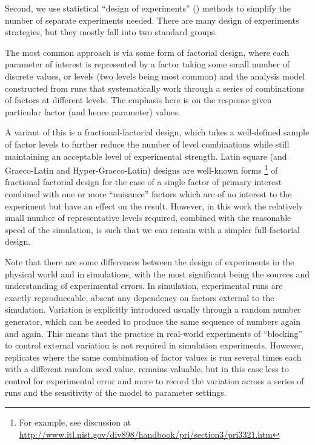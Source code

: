 Second, we use statistical ``design of experiments'' (\eg \cite{Montgomery2009}) methods to simplify the number of separate experiments needed. There are many design of experiments strategies, but they mostly fall into two standard groups. 

The most common approach is via some form of factorial design, where each parameter of interest is represented by a factor taking some small number of discrete values, or levels (two levels being most common) and the analysis model constructed from runs that systematically work through a series of combinations of factors at different levels. The emphasis here is on the response given particular factor (and hence parameter) values. 

A variant of this is a fractional-factorial design, which takes a well-defined sample of factor levels to further reduce the number of level combinations while still maintaining an acceptable level of experimental strength. Latin square (and Graeco-Latin and Hyper-Graeco-Latin) designs are well-known forms \footnote{For example, see discussion at \url{http://www.itl.nist.gov/div898/handbook/pri/section3/pri3321.htm}} of fractional factorial design for the case of a single factor of primary interest combined with one or more ``nuisance'' factors which are of no interest to the experiment but have an effect on the result. However, in this work the relatively small number of representative levels required, combined with the reasonable speed of the simulation, is such that we can remain with a simpler full-factorial design.

Note that there are some differences between the design of experiments in the physical world and in simulations, with the most significant being the sources and understanding of experimental errors. In simulation, experimental runs are exactly reproduceable, absent any dependency on factors external to the simulation. Variation is explicitly introduced usually through a random number generator, which can be seeded to produce the same sequence of numbers again and again. This means that the practice in real-world experiments of ``blocking'' to control external variation is not required in simulation experiments. However, \gls{replicate}s where the same combination of factor values is run several times each with a different random seed value, remains valuable, but in this case less to control for experimental error and more to record the variation across a series of runs and the sensitivity of the model to parameter settings.

